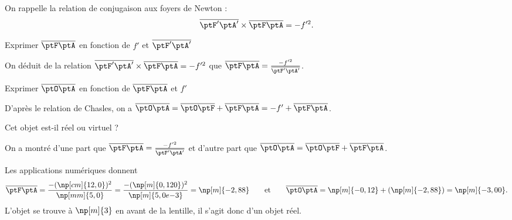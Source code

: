 On rappelle la relation de conjugaison aux foyers de Newton : 
\[
\overline{\ptF'\ptA'}\times\overline{\ptF\ptA}=-f'^2.
\]

\debutEntrainement


\begin{enonce}
Exprimer $\overline{\ptF\ptA}$ en fonction de $f'$ et $\overline{\ptF'\ptA'}$
\end{enonce}


\begin{corrige}
On déduit de la relation  $\overline{\ptF'\ptA'}\times\overline{\ptF\ptA}=-f'^2$ que $\overline{\ptF\ptA}=\frac{-f'^2}{\overline{\ptF'\ptA'}}$.
\end{corrige}




\begin{enonce}
Exprimer $\overline{\ptO\ptA}$ en fonction de $\overline{\ptF\ptA}$ et $f'$
\end{enonce}


\begin{corrige}
D'après le relation de Chasles, on a $\overline{\ptO\ptA}=\overline{\ptO\ptF}+\overline{\ptF\ptA}=-f'+\overline{\ptF\ptA}$. 
\end{corrige}




\begin{enonce}
Cet objet est-il réel ou virtuel ?
\end{enonce}


\begin{corrige}
On a montré d'une part que $\overline{\ptF\ptA}=\frac{-f'^2}{\overline{\ptF'\ptA'}}$ et d'autre part que $\overline{\ptO\ptA}=\overline{\ptO\ptF}+\overline{\ptF\ptA}$. 

Les applications numériques donnent 
\[
\overline{\ptF\ptA}=\frac{-(\np[cm]{12,0})^2}{\np[mm]{5,0}}=\frac{-(\np[m]{0,120})^2}{\np[m]{5,0e{-3}}}=\np[m]{-2,88}
\qquad\text{et}\qquad
\overline{\ptO\ptA}=\np[m]{-0,12}+(\np[m]{-2,88})=\np[m]{-3,00}.
\]
L'objet se trouve à $\np[m]{3}$ en avant de la lentille, il s'agit donc d'un objet réel.
\end{corrige}

